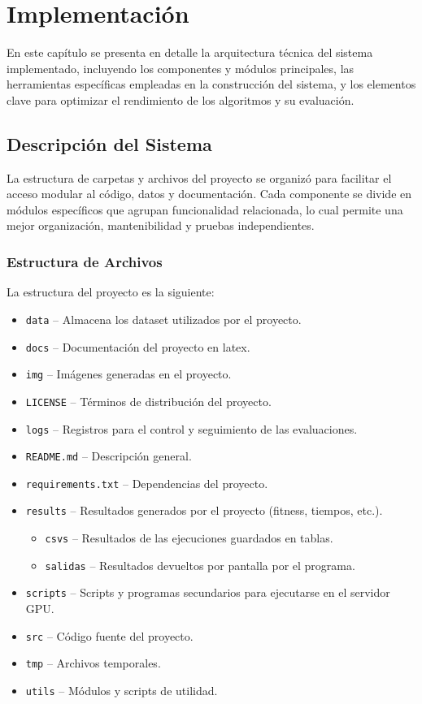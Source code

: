 \chapter{Implementación}\label{ch:implementacion}
En este capítulo se presenta en detalle la arquitectura técnica del sistema implementado, incluyendo los componentes y
módulos principales, las herramientas específicas empleadas en la construcción del sistema, y los elementos clave para
optimizar el rendimiento de los algoritmos y su evaluación.


\section{Descripción del Sistema}\label{sec:descripcion-del-sistema}
La estructura de carpetas y archivos del proyecto se organizó para facilitar el acceso modular al código, datos y
documentación.
Cada componente se divide en módulos específicos que agrupan funcionalidad relacionada, lo cual permite una mejor
organización, mantenibilidad y pruebas independientes.

\subsection{Estructura de Archivos}\label{subsec:estructura-de-archivos}
La estructura del proyecto es la siguiente:
\begin{itemize}
    \item \texttt{data} -- Almacena los dataset utilizados por el proyecto.
    \item \texttt{docs} -- Documentación del proyecto en latex.
    \item \texttt{img} -- Imágenes generadas en el proyecto.
    \item \texttt{LICENSE} -- Términos de distribución del proyecto.
    \item \texttt{logs} -- Registros para el control y seguimiento de las evaluaciones.
    \item \texttt{README.md} -- Descripción general.
    \item \texttt{requirements.txt} -- Dependencias del proyecto.
    \item \texttt{results} -- Resultados generados por el proyecto (fitness, tiempos, etc.).
    \begin{itemize}
        \item \texttt{csvs} -- Resultados de las ejecuciones guardados en tablas.
        \item \texttt{salidas} -- Resultados devueltos por pantalla por el programa.
    \end{itemize}
    \item \texttt{scripts} -- Scripts y programas secundarios para ejecutarse en el servidor GPU\@.
    \item \texttt{src} -- Código fuente del proyecto.
    \item \texttt{tmp} -- Archivos temporales.
    \item \texttt{utils} -- Módulos y scripts de utilidad.
\end{itemize}

